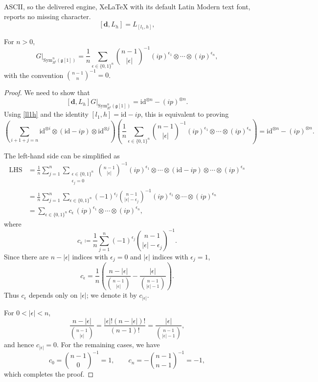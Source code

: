 \documentclass[10pt,a4paper]{amsart}
\newcommand{\Sym}{\mathrm{Sym}}
\newcommand{\bfd}{\mathbf{d}}
\newcommand{\fg}{\mathfrak{g}}
\newcommand{\id}{\mathrm{id}}
\newcommand{\uR}{{R^\sharp}}
\begin{document}
ASCII, so the delivered engine, XeLaTeX with its default Latin Modern text font, reports no missing character.
	\begin{equation}\label{ll1h}
		[\bfd, L_h] =  L_{[l_1,h]}, 
	\end{equation}

	\begin{lem}\label{berg}
		For $n>0$,
		\[
		G\big|_{\Sym_\uR^n(\fg[1])} =\frac{1}{n} \sum_{\epsilon \in \{0,1\}^n} \binom{n-1}{|\epsilon|}^{-1} (ip)^{\epsilon_1} \otimes \cdots \otimes (ip)^{\epsilon_n},
		\]
		with the convention $\binom{n-1}{n}^{-1}=0$.
	\end{lem}

	\begin{proof}
	We need to show that
	\[
	[\bfd,L_h]G\big|_{\Sym_\uR^n(\fg[1])} =\id^{\otimes n}-(ip)^{\otimes n}.
	\]
	Using \eqref{ll1h} and the identity $[l_1,h]=\id-ip$, this is equivalent to proving
	\[
	\left(\sum_{i+1+j=n}
	\id^{\otimes i}\otimes(\id-ip)\otimes\id^{\otimes j}\right)
	\left(
	\frac{1}{n}
	\sum_{\epsilon\in\{0,1\}^n}
	\binom{n-1}{|\epsilon|}^{-1}
	(ip)^{\epsilon_1}\otimes\cdots\otimes(ip)^{\epsilon_n}
	\right)
	=
	\id^{\otimes n}-(ip)^{\otimes n}.
	\]
	
	The left-hand side can be simplified as 
	\begin{align*}
		\mathrm{LHS}
		&=
		\frac1n
		\sum_{j=1}^n
		\sum_{\substack{\epsilon\in\{0,1\}^n \\ \epsilon_j=0}}
		\binom{n-1}{|\epsilon|}^{-1}
		(ip)^{\epsilon_1}\otimes\cdots\otimes(\id-ip)\otimes\cdots\otimes(ip)^{\epsilon_n}\\
		&=
		\frac1n
		\sum_{j=1}^n
		\sum_{\epsilon\in\{0,1\}^n}
		(-1)^{\epsilon_j}
		\binom{n-1}{|\epsilon|-\epsilon_j}^{-1}
		(ip)^{\epsilon_1}\otimes\cdots\otimes(ip)^{\epsilon_n}\\
		&=
		\sum_{\epsilon\in\{0,1\}^n}
		c_\epsilon\,
		(ip)^{\epsilon_1}\otimes\cdots\otimes(ip)^{\epsilon_n},
	\end{align*}
	where
	\[
	c_\epsilon
	\coloneqq
	\frac1n
	\sum_{j=1}^n
	(-1)^{\epsilon_j}
	\binom{n-1}{|\epsilon|-\epsilon_j}^{-1}.
	\]
	Since there are $n-|\epsilon|$ indices with $\epsilon_j=0$ and $|\epsilon|$ indices with $\epsilon_j=1$,
	\[
	c_\epsilon
	=
	\frac1n
	\left(
	\frac{n-|\epsilon|}{\binom{n-1}{|\epsilon|}}
	-
	\frac{|\epsilon|}{\binom{n-1}{|\epsilon|-1}}
	\right).
	\]
	Thus $c_\epsilon$ depends only on $|\epsilon|$; we denote it by $c_{|\epsilon|}$.
	
	For \(0<|\epsilon|<n\),
	\[
	\frac{n-|\epsilon|}{\binom{n-1}{|\epsilon|}}
	=
	\frac{|\epsilon|!(n-|\epsilon|)!}{(n-1)!}
	=
	\frac{|\epsilon|}{\binom{n-1}{|\epsilon|-1}},
	\]
	and hence $c_{|\epsilon|}=0$. For the remaining cases, we have
	\[
	c_0=\binom{n-1}{0}^{-1}=1,
	\qquad
	c_n=-\binom{n-1}{n-1}^{-1}=-1,
	\]
	which completes the proof.
	\end{proof}
\end{document}
